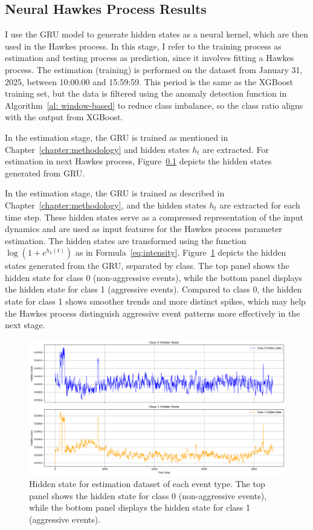 \newpage

\subsection{Neural Hawkes Process Results}
I use the GRU model to generate hidden states as a neural kernel, which are then used in the Hawkes process. In this stage, I refer to the training process as estimation and testing process as prediction, since it involves fitting a Hawkes process. The estimation (training) is performed on the dataset from January 31, 2025, between 10:00:00 and 15:59:59. This period is the same as the XGBoost training set, but the data is filtered using the anomaly detection function in Algorithm~\ref{al: window-based} to reduce class imbalance, so the class ratio aligns with the output from XGBoost.

In the estimation stage, the GRU is trained as mentioned in Chapter~\ref{chapter:methodology} and hidden states $h_t$ are extracted. For estimation in next Hawkes process, Figure~\ref{} depicts the hidden states generated from GRU.

In the estimation stage, the GRU is trained as described in Chapter~\ref{chapter:methodology}, and the hidden states $h_t$ are extracted for each time step. These hidden states serve as a compressed representation of the input dynamics and are used as input features for the Hawkes process parameter estimation. The hidden states are transformed using the function $\log(1 + e^{h_k(t)})$ as in Formula~\ref{eq:intensity}. Figure~\ref{fig:train-hidden-state} depicts the hidden states generated from the GRU, separated by class. The top panel shows the hidden state for class 0 (non-aggressive events), while the bottom panel displays the hidden state for class 1 (aggressive events). Compared to class 0, the hidden state for class 1 shows smoother trends and more distinct spikes, which may help the Hawkes process distinguish aggressive event patterns more effectively in the next stage.

\begin{figure}[H]
    \centering
    \includegraphics[width=0.95\linewidth]{figures/train-hidden-state.png}
    \caption{Hidden state for estimation dataset of each event type. The top panel shows the hidden state for class 0 (non-aggressive events), while the bottom panel displays the hidden state for class 1 (aggressive events).}
    \label{fig:train-hidden-state}
\end{figure}


